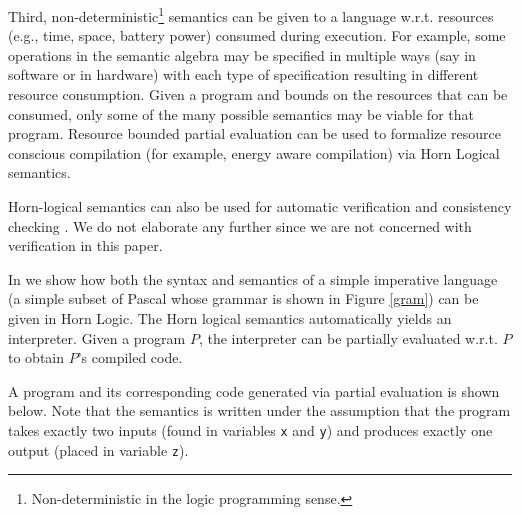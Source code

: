 \documentclass{entcs}
\begin{document}
Third, non-deterministic\footnote{Non-deterministic in the logic programming
sense.} semantics can be given to a language w.r.t.
resources (e.g., time, space, battery power) consumed during execution. For
example, some operations in the semantic algebra may be specified in multiple
ways (say in software or in hardware) with each type of specification resulting
in different resource consumption. 
Given a program and bounds on the resources that can
be consumed, only some of the many possible semantics may be viable for that
program. Resource bounded partial evaluation \cite{debray} can be used to
formalize resource conscious compilation (for example, energy aware compilation)
\cite{guptawang} via Horn Logical semantics.

Horn-logical semantics can also be used for automatic verification and
consistency checking \cite{logden,ieee}. We do not elaborate any further
since we are not concerned with verification in this paper.

\begin{figwindow}[1,l,%
\fbox{\begin{minipage}[b]{.52\textwidth}
{\tt

Program ::= C.

C ::= C1;C2 |

~~~~~loop while B C end while |

~~~~~if B then C1 else C2 endif |

~~~~~I := E

E ::= N | Identifier | E1 + E2 |

~~~~~E1 - E2 | E1 * E2 | (E)

N ::= 0 | 1 | 2 | ... | 9

Identifier ::= w | x | y | z
}\end{minipage}},%
{BNF grammar \label{gram}}]
In \cite{logden} we show how both the syntax and semantics of a simple imperative language
(a simple subset of Pascal whose grammar is shown in Figure \ref{gram}) can be
given in Horn Logic. The Horn logical semantics automatically yields an
interpreter. Given a program $P$, the interpreter can be partially evaluated w.r.t.
$P$ to obtain $P$'s compiled code.

A program and its corresponding code generated via partial evaluation is shown below.
Note that the semantics is written under the assumption that the program takes exactly
two inputs (found in variables {\tt x} and {\tt y}) and produces exactly one output
(placed in variable {\tt z}).
\end{figwindow}
\end{document}
